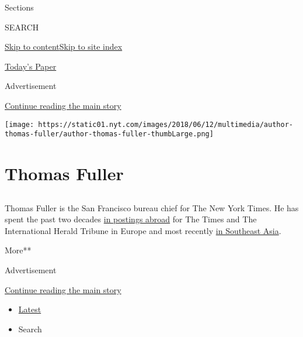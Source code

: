Sections

SEARCH

\protect\hyperlink{site-content}{Skip to
content}\protect\hyperlink{site-index}{Skip to site index}

\href{https://myaccount.nytimes.com/auth/login?response_type=cookie\&client_id=vi}{}

\href{https://www.nytimes.com/section/todayspaper}{Today's Paper}

Advertisement

\protect\hyperlink{after-top}{Continue reading the main story}

\texttt{[image: https://static01.nyt.com/images/2018/06/12/multimedia/author-thomas-fuller/author-thomas-fuller-thumbLarge.png]}

\hypertarget{thomas-fuller}{%
\section{Thomas Fuller}\label{thomas-fuller}}

\subsection{}

Thomas Fuller is the San Francisco bureau chief for The New York Times.
He has spent the past two decades
\href{http://www.nytimes.com/2013/10/14/world/asia/asias-lands-of-charm-and-cruelty.html}{in
postings abroad} for The Times and The International Herald Tribune in
Europe and most recently
\href{https://www.nytimes.com/2016/02/22/world/asia/reporting-on-life-death-and-corruption-in-southeast-asia.html}{in
Southeast Asia}.

More**

Advertisement

\protect\hyperlink{after-mid1}{Continue reading the main story}

\begin{itemize}
\tightlist
\item
  \protect\hyperlink{stream-panel}{Latest}
\item
  Search
\end{itemize}

